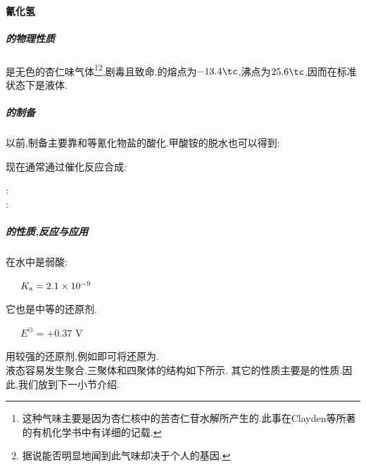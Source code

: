 \documentclass{ctexart}
\begin{document}
\paragraph{氰化氢}
\subparagraph{的物理性质}
是无色的杏仁味气体\footnote{这种气味主要是因为杏仁核中的苦杏仁苷水解所产生的.此事在Clayden等所著的有机化学书中有详细的记载.}\footnote{据说能否明显地闻到此气味却决于个人的基因.},剧毒且致命.的熔点为$-13.4\tc$,沸点为$25.6\tc$,因而在标准状态下是液体.
\subparagraph{的制备}
以前,制备主要靠和等氰化物盐的酸化.甲酸铵的脱水也可以得到:
\begin{center}
\end{center}
现在通常通过催化反应合成:
\begin{center}
    :\ \\
    :\ 
\end{center}
\subparagraph{的性质,反应与应用}
在水中是弱酸:
\begin{center}
    \ \ \ $K_{\text a}=2.1\times10^{-9}$
\end{center}
它也是中等的还原剂.
\begin{center}
    \ \ \ $E^\ominus=+0.37\text{ V}$
\end{center}
用较强的还原剂,例如即可将还原为.\\
\indent 液态容易发生聚合.三聚体和四聚体的结构如下所示.
\indent 其它的性质主要是的性质.因此,我们放到下一小节介绍.
\end{document}
